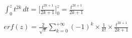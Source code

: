 \documentclass[preview]{standalone}
\begin{document}
\begin{align*}
\int_0^z { t^{2k} } \, dt = \Big[ \frac{t^{2k+1}}{2k+1} \Big]_0^z = \frac{t^{2k+1}}{2k+1} \\ \\ erf(z) = { \frac{2}{\sqrt{\pi}} } \sum_{k=0}^{+\infty} (-1)^k \times \frac{1}{k!} \times \frac{t^{2k+1}}{2k+1}
\end{align*}
\end{document}

